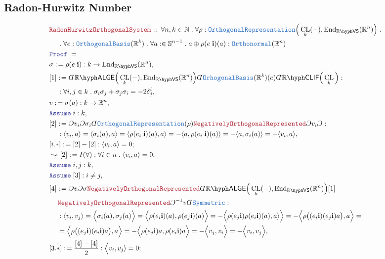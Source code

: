 \documentclass[12pt]{scrartcl}%
\newcommand{\TYPE}[1]{\textcolor{NavyBlue}{\mathtt{#1}}}%
\newcommand{\LOGIC}[1]{\textcolor{Blue}{\mathtt{#1}}}%
\newcommand{\THM}[1]{\textcolor{Maroon}{\mathtt{#1}}}%
\renewcommand{\.}{\; . \;} %
\newcommand{\de}{: \kern 0.1pc =} %
\newcommand{\Theorem}[2]{& \THM{#1} \, :: \, #2 \\ & \Proof = \\ } %
\newcommand{\NewLine}{\\ & \kern 1pc}%
\newcommand{\Page}[1]{ \begin{align*} #1 \end{align*}  }%
\newcommand{ \bd }{ \ByDef }%
\newcommand{\Reals}{\mathbb{R}}%
\newcommand{\Nat}{\mathbb{N}}%
\newcommand{\End}{\mathrm{End}}%
\newcommand{\Say}[3]{& #1 \de #2 : #3, \\} %
\newcommand{\Conclude}[3]{& #1 \de #2 : #3; \\}%
\newcommand{\Derive}[3]{& \leadsto #1 \de #2 : #3, \\} %
\newcommand{\Assume}[2]{& \LOGIC{Assume} \; #1 : #2, \\} %
\newcommand{\ByDef}{\rotatebox[origin=c]{-180}{$D$}}%
\newcommand{\ByConstr}{\rotatebox[origin=c]{-180}{$C$}}%
\newcommand{\Proof}{\LOGIC{Proof} \; } %
\newcommand{\VS}[1]{#1\hyph\mathsf{VS}} %
\newcommand{\LALGE}[1]{#1\hyph\mathsf{ALGE}}%
\newcommand{\CLIF}[1]{#1\hyph\mathsf{CLIF}}%
\DeclareMathOperator{\CL}{CL}%
\begin{document}
\subsection{Radon-Hurwitz Number}
\Page{
	\Theorem{RadonHurwitzOrthogonalSystem}
	{
		\forall n, k \in \Nat \.
		\forall \rho : 
		\TYPE{OrthogonalRepresentation}
		\Big(\CL_k(-), \End_{\VS{\Reals}}(\Reals^n)\Big) \. 
		\NewLine \. 
		\forall e : \TYPE{OrthogonalBasis}(\Reals^k) \.
		\forall a : \in \mathbb{S}^{n-1} \.
		a \oplus 
		\rho(e \; \mathbf{i})(a) : \TYPE{Orthonormal}(\Reals^n)          
	}
	\Say{\sigma}{\rho(e \; \mathbf{i})}
	{
		k \to \End_{\VS{\Reals}}(\Reals^n) 
	}
	\Say{[1]}{
		\bd \LALGE{\Reals}\Big(\CL_k(-), \End_{\VS{\Reals}}(\Reals^n)\Big) 
		\bd \TYPE{OrhogonalBasis}(\Reals^k)(e)
		\bd \CLIF{\Reals}\Big(\CL_k\Big)
	}
	{
		\NewLine :
		\forall i,j \in k \. 
		\sigma_i\sigma_j + \sigma_j\sigma_i = -2\delta^i_j
	}
	\Say{v}{\sigma(a)}{k \to \Reals^n}
	\Assume{i}{ k }
	\Say{[2]}{ 	
		\ByConstr v_i
		\ByConstr \sigma_i
		\bd \TYPE{OrthogonalRepresentation}(\rho)
		\THM{NegativelyOrthogonalRepresented} 
		\ByConstr v_i
		\ByConstr 
	}
	{
		\NewLine : 
		\langle v_i, a \rangle = 
		\langle \sigma_i(a), a \rangle = 
		\langle \rho(e_i \; \mathbf{i})(a), a \rangle = 
	       -\langle  a, \rho(e_i \; \mathbf{i})(a) \rangle =
	       -\langle a, \sigma_i(a) \rangle = 
	       -\langle v_i, a \rangle 
	}
	\Conclude{[i.*]}{[2]-[2] }{\langle v_i, a\rangle = 0}
	\Derive{[2]}{I(\forall) }
	{
		\forall i \in n \. \langle v_i, a \rangle = 0
	}
	\Assume{i,j}{k}
	\Assume{[3]}{i \neq j}
	\Say{[4]}{	
		\ByConstr v
		\ByConstr \sigma
		\THM{NegativelyOrthogonalRepresented} 
		\bd \LALGE{\Reals}\Big(
			\CL_k(-), 
			\End_{\VS{\Reals}}(\Reals^n)
		\Big)
		[1]
		\NewLine                     
		\THM{NegativelyOrthogonalRepresented} 
		\ByConstr^{-1} v
		\bd \TYPE{Symmetric}
	}
	{
		\NewLine :
		\langle  v_i, v_j \rangle =
		\Big\langle \sigma_i(a),\sigma_j(a) \Big\rangle =
		\Big\langle  \rho(e_i  \mathbf{i})(a), 
			     \rho(e_j  \mathbf{i})(a)  
		\Big\rangle =
		-\Big\langle  
			    \rho(e_j  \mathbf{i})
			    \rho(e_i  \mathbf{i})(a), 
			     a  \rangle
		\Big\rangle =
		-\Big\langle
			\rho\big( 
			(e_i \mathbf{i})(e_j \mathbf{i})a\big), a
		\Big\rangle = \NewLine =
		\Big\langle
			\rho\big( 
			(e_j \mathbf{i})(e_i \mathbf{i})a\big), a	
		\Big\rangle =
		-\Big\langle
			\rho (e_j \mathbf{i}) a,  \rho(e_i \mathbf{i}) a	
		\Big\rangle =
		-\Big\langle
			v_j,  v_i
		\Big\rangle =
		-\Big\langle
			v_i, v_j
		\Big\rangle
	}
	\Conclude{[3.*]}{\frac{[4]-[4]}{2}}{
		\Big\langle v_i, v_j \rangle = 0	
}}
\end{document}

